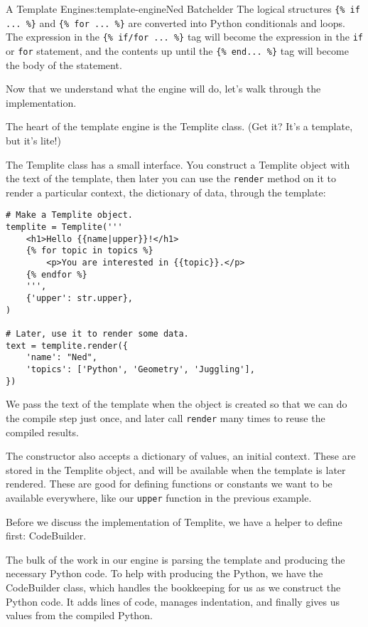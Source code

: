 \begin{aosachapter}{A Template Engine}{s:template-engine}{Ned Batchelder}
The logical structures \texttt{\{\% if ... \%\}} and
\texttt{\{\% for ... \%\}} are converted into Python conditionals and
loops. The expression in the \texttt{\{\% if/for ... \%\}} tag will
become the expression in the \texttt{if} or \texttt{for} statement, and
the contents up until the \texttt{\{\% end... \%\}} tag will become the
body of the statement.

\label{writing-the-engine}

Now that we understand what the engine will do, let's walk through the
implementation.

\label{the-templite-class}

The heart of the template engine is the Templite class. (Get it? It's a
template, but it's lite!)

The Templite class has a small interface. You construct a Templite
object with the text of the template, then later you can use the
\texttt{render} method on it to render a particular context, the
dictionary of data, through the template:

\begin{verbatim}
# Make a Templite object.
templite = Templite('''
    <h1>Hello {{name|upper}}!</h1>
    {% for topic in topics %}
        <p>You are interested in {{topic}}.</p>
    {% endfor %}
    ''',
    {'upper': str.upper},
)

# Later, use it to render some data.
text = templite.render({
    'name': "Ned",
    'topics': ['Python', 'Geometry', 'Juggling'],
})
\end{verbatim}

We pass the text of the template when the object is created so that we
can do the compile step just once, and later call \texttt{render} many
times to reuse the compiled results.

The constructor also accepts a dictionary of values, an initial context.
These are stored in the Templite object, and will be available when the
template is later rendered. These are good for defining functions or
constants we want to be available everywhere, like our \texttt{upper}
function in the previous example.

Before we discuss the implementation of Templite, we have a helper to
define first: CodeBuilder.

\label{codebuilder}

The bulk of the work in our engine is parsing the template and producing
the necessary Python code. To help with producing the Python, we have
the CodeBuilder class, which handles the bookkeeping for us as we
construct the Python code. It adds lines of code, manages indentation,
and finally gives us values from the compiled Python.


\end{aosachapter}
